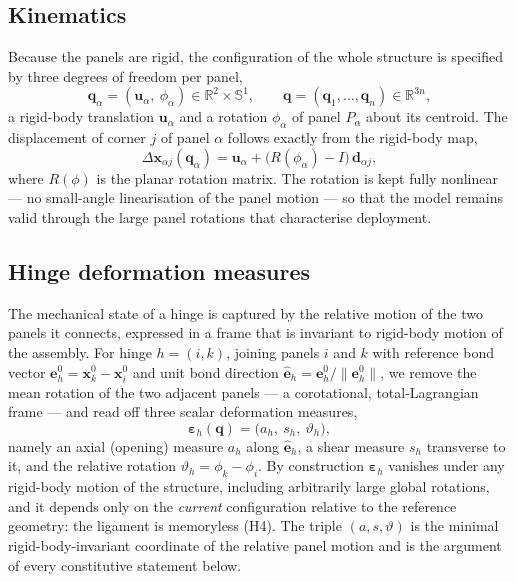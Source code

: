 \documentclass[pdflatex,sn-mathphys-num]{sn-jnl}%
\theoremstyle{thmstyleone}%
\theoremstyle{thmstyletwo}%
\theoremstyle{thmstylethree}%
\newcommand{\epsh}{\bm{\varepsilon}}
\begin{document}
\subsection{Kinematics}

Because the panels are rigid, the configuration of the whole structure is
specified by three degrees of freedom per panel,
\begin{equation}
  \bm{q}_\alpha = (\bm{u}_\alpha,\ \phi_\alpha) \in \mathbb{R}^2 \times \mathbb{S}^1,
  \qquad
  \bm{q} = (\bm{q}_1,\dots,\bm{q}_{n}) \in \mathbb{R}^{3n},
\end{equation}
a rigid-body translation $\bm{u}_\alpha$ and a rotation $\phi_\alpha$ of panel
$P_\alpha$ about its centroid. The displacement of corner $j$ of panel $\alpha$
follows exactly from the rigid-body map,
\begin{equation}
  \Delta\bm{x}_{\alpha j}(\bm{q}_\alpha)
    = \bm{u}_\alpha + \bigl(R(\phi_\alpha) - I\bigr)\,\bm{d}_{\alpha j},
\end{equation}
where $R(\phi)$ is the planar rotation matrix. The rotation is kept fully
nonlinear --- no small-angle linearisation of the panel motion --- so that the
model remains valid through the large panel rotations that characterise
deployment.

\subsection{Hinge deformation measures}

The mechanical state of a hinge is captured by the relative motion of the two
panels it connects, expressed in a frame that is invariant to rigid-body motion of
the assembly. For hinge $h=(i,k)$, joining panels $i$ and $k$ with reference bond
vector $\bm{e}_h^{0} = \bm{x}_k^{0} - \bm{x}_i^{0}$ and unit bond direction
$\hat{\bm{e}}_h = \bm{e}_h^{0}/\lVert\bm{e}_h^{0}\rVert$, we remove the mean
rotation of the two adjacent panels --- a corotational, total-Lagrangian frame ---
and read off three scalar deformation measures,
\begin{equation}
  \epsh_h(\bm{q}) = \bigl(a_h,\ s_h,\ \vartheta_h\bigr),
  \label{eq:hinge-strain}
\end{equation}
namely an axial (opening) measure $a_h$ along $\hat{\bm{e}}_h$, a shear measure
$s_h$ transverse to it, and the relative rotation $\vartheta_h = \phi_k - \phi_i$.
By construction $\epsh_h$ vanishes under any rigid-body motion of the structure,
including arbitrarily large global rotations, and it depends only on the
\emph{current} configuration relative to the reference geometry: the ligament is
memoryless (H4). The triple $(a,s,\vartheta)$ is the minimal rigid-body-invariant
coordinate of the relative panel motion and is the argument of every constitutive
statement below.
\end{document}

